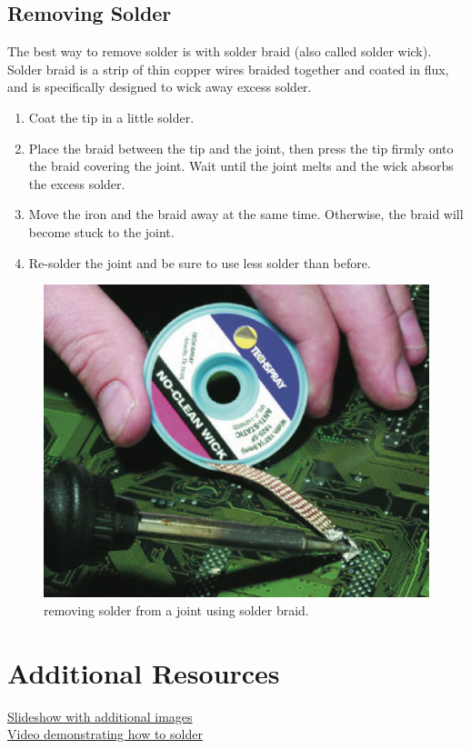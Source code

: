 \subsection{Removing Solder}
The best way to remove solder is with solder braid (also called solder wick). Solder braid is a strip of thin copper wires braided together and coated in flux, and is specifically designed to wick away excess solder.
\begin{enumerate}
    \item Coat the tip in a little solder.
    \item Place the braid between the tip and the joint, then press the tip firmly onto the braid covering the joint. Wait until the joint melts and the wick absorbs the excess solder.
    \item Move the iron and the braid away at the same time. Otherwise, the braid will become stuck to the joint.
    \item Re-solder the joint and be sure to use less solder than before.
\end{enumerate}
\begin{figure}[h]
    \caption{removing solder from a joint using solder braid.}
    \centering \includegraphics[scale=0.5]{images/wicking.jpg}
\end{figure}

\section{Additional Resources}
\href{https://docs.google.com/presentation/d/1gsUb53UJUmAFMdqCDinAuhG2tvJvpA0dKFnbgJBPr4M/edit?usp=sharing}{Slideshow with additional images} \\
\href{https://www.youtube.com/watch?v=VxMV6wGS3NY}{Video demonstrating how to solder}

